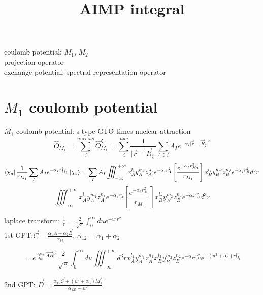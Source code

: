 \documentclass{article}
\title{AIMP integral}
\author{}
\date{}
\begin{document}
\maketitle
\noindent
coulomb potential: $M_1$, $M_2$\\
projection operator\\
exchange potential: spectral representation operator

\newpage
\section{$M_1$ coulomb potential}
	$M_1$ coulomb potential: s-type GTO times nuclear attraction
	\begin{displaymath}
		\hat{O}_{M_1}=\sum_{\zeta}^{nucleus} \hat{O}^{\zeta}_{M_1}
		=\sum_{\zeta}^{nuc} \frac{1}{\vert \vec{r}-\vec{R}_\zeta \vert}
		\sum_{I\in\zeta} A_I e^{-\alpha_I \vert \vec{r}-\vec{R}_\zeta \vert^2} 
	\end{displaymath}
	\begin{displaymath}
		\bra{\chi_a} \frac{1}{r_{M_1}} \sum_I A_Ie^{-\alpha_I r^2_{M_1}} \ket{\chi_b}
		=\sum_I A_I \iiint^{+\infty}_{-\infty} x^{l_i}_A y^{m_i}_A z^{n_i}_A e^{-\alpha_i r^2_A} 
		\left[\frac{e^{-\alpha_I r_{M_1}^2}}{r_{M_1}}\right] x_B^{l_j} y_B^{m_j} z_B^{n_j} 
		e^{-\alpha_j r_B^2} d^3r 
	\end{displaymath}
	\begin{displaymath}
		\iiint_{-\infty}^{+\infty} x^{l_1}_A y^{m_1}_A z^{n_1}_A e^{-\alpha_1 r^2_A} 
		\left[\frac{e^{-\alpha_3 r_{M_1}^2}}{r_{M_1}}\right] x_B^{l_2} y_B^{m_2} z_B^{n_2} 
		e^{-\alpha_2 r_B^2} d^3r
	\end{displaymath}
	\begin{center}
		laplace transform: $\frac{1}{r}=\frac{2}{\sqrt{\pi}}\int_0^{\infty}du e^{-u^2r^2}$\\
		1st GPT:$\vec{C}=\frac{\alpha_1 \vec{A}+\alpha_2 \vec{B}}{\alpha_12}$, $\alpha_{12}=\alpha_1+\alpha_2$
	\end{center}
	\begin{displaymath}
		=e^{\frac{\alpha_1\alpha_2}{\alpha_{12}} \vert \overrightarrow{AB} \vert^2}
		\frac{2}{\sqrt{\pi}}\int_0^{\infty}du \iiint^{+\infty}_{-\infty}d^3r
		x^{l_1}_A y^{m_1}_A z^{n_1}_A x_B^{l_2} y_B^{m_2} z_B^{n_2}
		e^{-\alpha_{12}r_C^2}e^{-(u^2+\alpha_3)r_{M_1}^2}
	\end{displaymath}
	\begin{center}
		2nd GPT: $\vec{D}=\frac{\alpha_{12}\vec{C}+(u^2+\alpha_3)\vec{M_1}}{\alpha_{123}+u^2}$
	\end{center}
\end{document}
